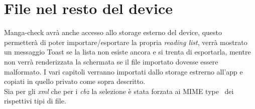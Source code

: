 \documentclass[../Assignment-3-LPSMT.tex]{subfiles}
\begin{document}
\begin{center}
  
  
\end{center}

\section{File nel resto del device}

Manga-check avrà anche accesso allo storage esterno del device, questo permetterà di poter importare/esportare la propria \emph{reading list}, verrà mostrato un messaggio Toast se la lista non esiste ancora e si trenta di esportarla, mentre non verrà renderizzata la schermata se il file importato dovesse essere malformato.
I vari capitoli verranno importati dallo storage estrerno all'app e copiati in quello privato come sopra descritto.\\
Sia per gli \emph{xml} che per i \emph{cbz} la selezione è stata forzata ai MIME type~\cite{rfc6838} dei rispettivi tipi di file.
\end{document}
